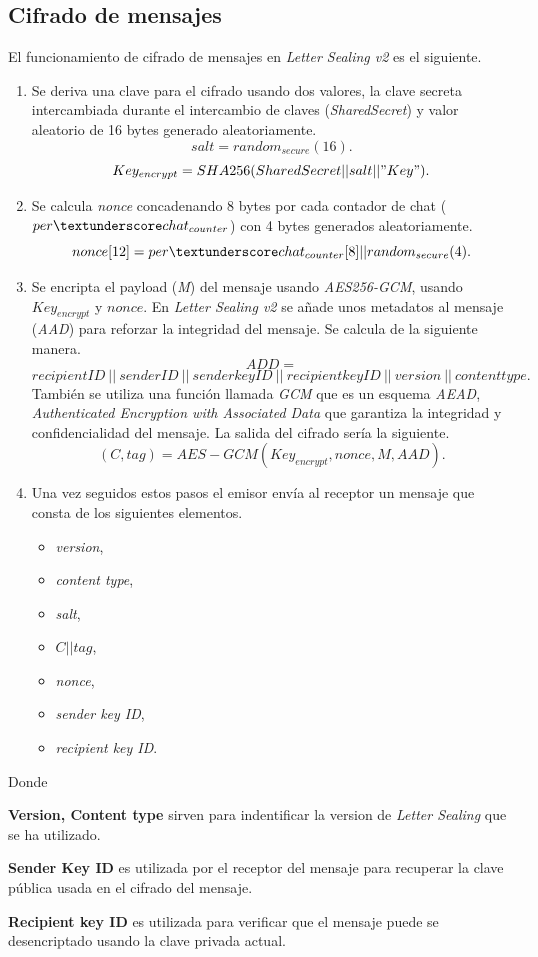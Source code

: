 \subsection{Cifrado de mensajes}
El funcionamiento de cifrado de mensajes en \emph{Letter Sealing v2} es el siguiente.
\begin{enumerate}
	\item Se deriva una clave para el cifrado usando dos valores, la clave secreta intercambiada durante el intercambio de claves (\emph{SharedSecret}) y valor aleatorio de 16 bytes generado aleatoriamente.
		$$
			salt = random_{secure}(16).
		$$
		$$
			Key_{encrypt}=SHA256(SharedSecret||salt||"Key").
		$$
	\item Se calcula \emph{nonce} concadenando 8 bytes por cada contador de chat ($per\textunderscore chat_{counter}$) con 4 bytes generados aleatoriamente.
		$$
			nonce[12]=per\textunderscore chat_{counter}[8] || random_{secure}(4).
		$$
	\item Se encripta el payload (\emph{M}) del mensaje usando \emph{AES256-GCM}, usando $Key_{encrypt}$ y $nonce$. En \emph{Letter Sealing v2} se añade unos metadatos al mensaje (\emph{AAD}) para reforzar la integridad del mensaje. Se calcula de la siguiente manera.
		$$
			ADD =
		$$
		$$
			 recipientID\:||\: senderID\:||\:senderkeyID\:||\:recipientkeyID\:||\:version\:||\:contenttype.
		$$
		También se utiliza una función llamada \emph{GCM} que es un esquema \emph{AEAD}, \emph{Authenticated Encryption with Associated Data} que garantiza la integridad y confidencialidad del mensaje. La salida del cifrado sería la siguiente.
		$$
			(C,tag) = AES - GCM(Key_{encrypt}, nonce, M, AAD).
		$$
	\item Una vez seguidos estos pasos el emisor envía al receptor un mensaje que consta de los siguientes elementos.\\
	\begin{itemize}
		\item \emph{version},
		\item \emph{content type},
		\item \emph{salt},
		\item $C||tag$,
		\item \emph{nonce},
		\item \emph{sender key ID},
		\item \emph{recipient key ID}.
	\end{itemize}
\end{enumerate}
Donde 
\begin{description}
	\item \textbf{Version, Content type} sirven para indentificar la version de \emph{Letter Sealing} que se ha utilizado.
	\item \textbf{Sender Key ID} es utilizada por el receptor del mensaje para recuperar la clave pública usada en el cifrado del mensaje.
	\item \textbf{Recipient key ID} es utilizada para verificar que el mensaje puede se desencriptado usando la clave privada actual.
\end{description}

